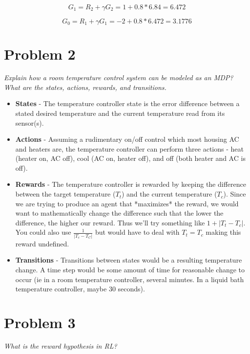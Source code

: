 \documentclass{article}
\begin{document}
\begin{equation}
    G_1 = R_2 + \gamma G_2 = 1 + 0.8 * 6.84 = 6.472
\end{equation}

\begin{equation}
    G_0 = R_1 + \gamma G_1 = -2 + 0.8 * 6.472 = 3.1776
\end{equation}


\section*{Problem 2}

\textit{Explain how a room temperature control system can be modeled as an MDP? What are the states, actions, rewards, and transitions.}

\begin{itemize}
    \item \textbf{States} - The temperature controller state is the error difference between a stated desired temperature and the current temperature read from its sensor(s).
    \item \textbf{Actions} - Assuming a rudimentary on/off control which most housing AC and heaters are, the temperature controller can perform three actions - heat (heater on, AC off), cool (AC on, heater off), and off (both heater and AC is off).
    \item \textbf{Rewards} - The temperature controller is rewarded by keeping the difference between the target temperature ($T_t$) and the current temperature ($T_c$). Since we are trying to produce an agent that *maximizes* the reward, we would want to mathematically change the difference such that the lower the difference, the higher our reward. Thus we'll try something like $1 + | T_t - T_c |$. You could also use $\frac{1}{|T_c-T_C|}$ but would have to deal with $T_t = T_c$ making this reward undefined.
    \item \textbf{Transitions} - Transitions between states would be a resulting temperature change. A time step would be some amount of time for reasonable change to occur (ie in a room temperature controller, several minutes. In a liquid bath temperature controller, maybe 30 seconds).
\end{itemize}

\section*{Problem 3}

\textit{What is the reward hypothesis in RL?}
\end{document}
